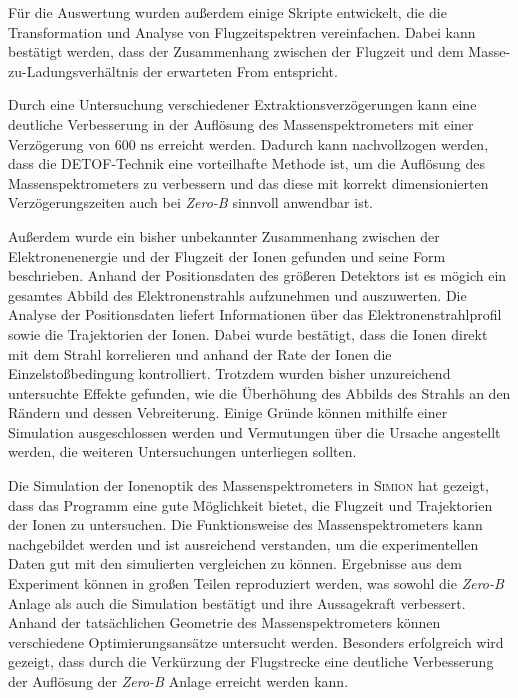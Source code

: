 Für die Auswertung wurden außerdem einige Skripte entwickelt, die die Transformation und Analyse von Flugzeitspektren vereinfachen. Dabei kann bestätigt werden, dass der Zusammenhang zwischen der Flugzeit und dem Masse-zu-Ladungsverhältnis der erwarteten From entspricht.

Durch eine Untersuchung verschiedener Extraktionsverzögerungen kann eine deutliche Verbesserung in der Auflösung des Massenspektrometers mit einer Verzögerung von 600 ns erreicht werden. Dadurch kann nachvollzogen werden, dass die DETOF-Technik eine vorteilhafte Methode ist, um die Auflösung des Massenspektrometers zu verbessern und das diese mit korrekt dimensionierten Verzögerungszeiten auch bei \textit{Zero-B} sinnvoll anwendbar ist.

Außerdem wurde ein bisher unbekannter Zusammenhang zwischen der Elektronenenergie und der Flugzeit der Ionen gefunden und seine Form beschrieben. Anhand der Positionsdaten des größeren Detektors ist es mögich ein gesamtes Abbild des Elektronenstrahls aufzunehmen und auszuwerten. Die Analyse der Positionsdaten liefert Informationen über das Elektronenstrahlprofil sowie die Trajektorien der Ionen. Dabei wurde bestätigt, dass die Ionen direkt mit dem Strahl korrelieren und anhand der Rate der Ionen die Einzelstoßbedingung kontrolliert. Trotzdem wurden bisher unzureichend untersuchte Effekte gefunden, wie die Überhöhung des Abbilds des Strahls an den Rändern und dessen Vebreiterung. Einige Gründe können mithilfe einer Simulation ausgeschlossen werden und Vermutungen über die Ursache angestellt werden, die weiteren Untersuchungen unterliegen sollten.

Die Simulation der Ionenoptik des Massenspektrometers in \textsc{Simion} hat gezeigt, dass das Programm eine gute Möglichkeit bietet, die Flugzeit und Trajektorien der Ionen zu untersuchen. Die Funktionsweise des Massenspektrometers kann nachgebildet werden und ist ausreichend verstanden, um die experimentellen Daten gut mit den simulierten vergleichen zu können. Ergebnisse aus dem Experiment können in großen Teilen reproduziert werden, was sowohl die \textit{Zero-B} Anlage als auch die Simulation bestätigt und ihre Aussagekraft verbessert. Anhand der tatsächlichen Geometrie des Massenspektrometers können verschiedene Optimierungsansätze untersucht werden. Besonders erfolgreich wird gezeigt, dass durch die Verkürzung der Flugstrecke eine deutliche Verbesserung der Auflösung der \textit{Zero-B} Anlage erreicht werden kann. 

